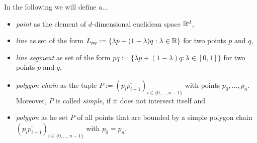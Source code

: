     \begin{definition}
        In the following we will define a... 
        \begin{itemize}[itemsep=-3pt]
            \item \emph{point} as the element of $d$-dimensional euclidean space $\mathbb{R}^d$,
            
            \item \emph{line} as set of the form $L_{pq} := \{\lambda p + (1 - \lambda)q : \lambda \in \mathbb{R}\}$ for two points $p$ and $q$,
            
            \item \emph{line segment} as set of the form $\overline{pq} := \{\lambda p + (1 - \lambda)q : \lambda \in [0, 1]\}$ for two points $p$ and $q$,
            
            \item \emph{polygon chain} as the tuple $P := (\overline{p_ip_{i+1}})_{i \in \{0, \dots, n-1\}}$ with points $p_0, \dots, p_n$. Moreover, $P$ is called \emph{simple}, if it does not intersect itself and
            
            \item \emph{polygon} as he set $P$ of all points that are bounded by a simple polygon chain $(\overline{p_ip_{i+1}})_{i \in \{0, \dots, n-1\}}$ with $p_0 = p_n$.
        \end{itemize}
    \end{definition}

